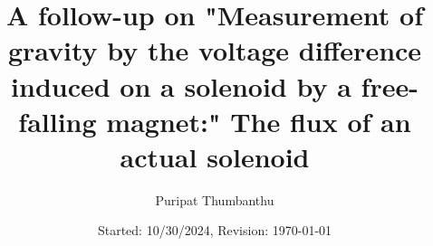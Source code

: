 \documentclass[b5paper, 11pt, openleft]{memoir}
\begin{document}
\frontmatter
\title{
	\vspace{-5em}
	\textbf{
		A follow-up on "Measurement of gravity by the voltage difference induced on a solenoid by a free-falling magnet:" The flux of an actual solenoid
	}
}
\author{Puripat Thumbanthu}
\date{Started: 10/30/2024, Revision: \today}
\maketitle

\vspace{-7em}
\tableofcontents*

\mainmatter






\printbibliography
\end{document}
